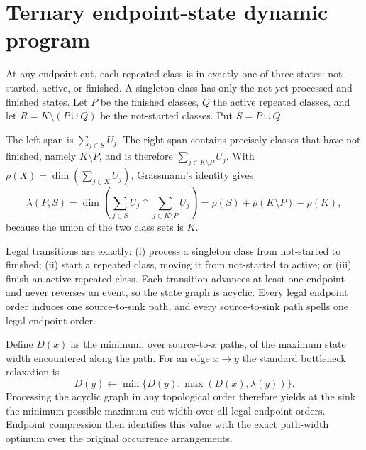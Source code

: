 \section{Ternary endpoint-state dynamic program}

At any endpoint cut, each repeated class is in exactly one of three states: not started, active, or finished.  A singleton class has only the not-yet-processed and finished states.  Let $P$ be the finished classes, $Q$ the active repeated classes, and let $R=K\setminus(P\cup Q)$ be the not-started classes.  Put $S=P\cup Q$.

The left span is $\sum_{j\in S}U_j$.  The right span contains precisely classes that have not finished, namely $K\setminus P$, and is therefore $\sum_{j\in K\setminus P}U_j$.  With $\rho(X)=\dim(\sum_{j\in X}U_j)$, Grassmann's identity gives
\[
 \lambda(P,S)
 =\dim\left(\sum_{j\in S}U_j\cap\sum_{j\in K\setminus P}U_j\right)
 =\rho(S)+\rho(K\setminus P)-\rho(K),
\]
because the union of the two class sets is $K$.

Legal transitions are exactly: (i) process a singleton class from not-started to finished; (ii) start a repeated class, moving it from not-started to active; or (iii) finish an active repeated class.  Each transition advances at least one endpoint and never reverses an event, so the state graph is acyclic.  Every legal endpoint order induces one source-to-sink path, and every source-to-sink path spells one legal endpoint order.

Define $D(x)$ as the minimum, over source-to-$x$ paths, of the maximum state width encountered along the path.  For an edge $x\to y$ the standard bottleneck relaxation is
\[
 D(y)\leftarrow\min\{D(y),\max(D(x),\lambda(y))\}.
\]
Processing the acyclic graph in any topological order therefore yields at the sink the minimum possible maximum cut width over all legal endpoint orders.  Endpoint compression then identifies this value with the exact path-width optimum over the original occurrence arrangements.
